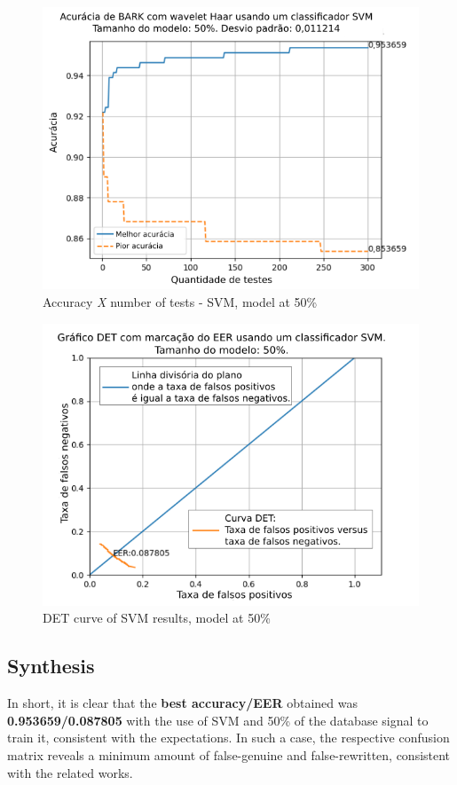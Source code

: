 			
			
			\begin{figure}[!h]
				\centering
				\includegraphics[width=\linewidth]{images/results/confusionMatrices/classifier_SVM_50.png}
				\caption{Accuracy \textit{X} number of tests - SVM, model at 50\%}
				\label{fig:classifiersvm50}
			\end{figure}
			
			\begin{figure}[!h]
				\centering
				\includegraphics[width=.9\linewidth]{images/results/det/DET_SVM_50}
				\caption{DET curve of SVM results, model at 50\%}
				\label{fig:detsvm50}
			\end{figure}
		
	\subsection{Synthesis}
		\par In short, it is clear that the \textbf{best accuracy/EER} obtained was \textbf{0.953659/0.087805} with the use of SVM and 50\% of the database signal to train it, consistent with the expectations. In such a case, the respective confusion matrix reveals a minimum amount of false-genuine and false-rewritten, consistent with the related works.
		
